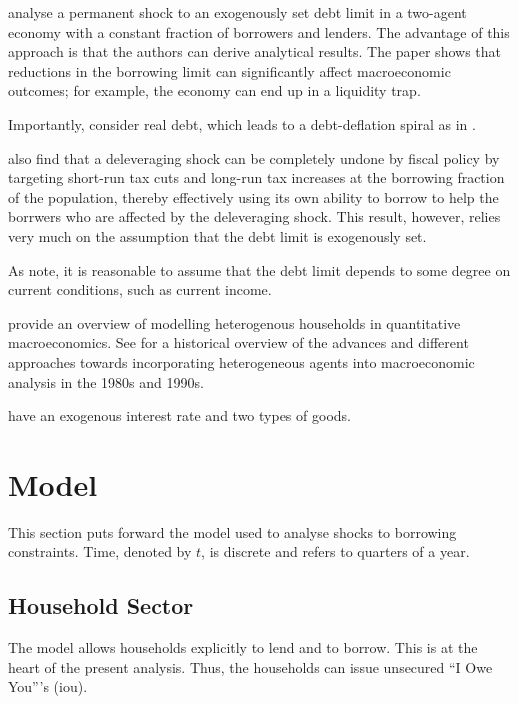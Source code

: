 \documentclass[12pt]{article} %
\numberwithin{equation}{section} %
\begin{document}
\textcite{egg2012} analyse a permanent shock to an exogenously set debt limit in a two-agent economy with a constant fraction of borrowers and lenders. The advantage of this approach is that the authors can derive analytical results. The paper shows that reductions in the borrowing limit can significantly affect macroeconomic outcomes; for example, the economy can end up in a liquidity trap.

Importantly, \textcite{egg2012} consider real debt, which leads to a debt-deflation spiral as in \textcite{fisher1933}.

\textcite{egg2012} also find that a deleveraging shock can be completely undone by fiscal policy by targeting short-run tax cuts and long-run tax increases at the borrowing fraction of the population, thereby effectively using its own ability to borrow to help the borrwers who are affected by the deleveraging shock. This result, however, relies very much on the assumption that the debt limit is exogenously set.

As \textcite{egg2012} note, it is reasonable to assume that the debt limit depends to some degree on current conditions, such as current income.

\textcite{heath2009} provide an overview of modelling heterogenous households in quantitative macroeconomics. See \textcite{cherrier2023} for a historical overview of the advances and different approaches towards incorporating heterogeneous agents into macroeconomic analysis in the 1980s and 1990s.

\textcite{riosrull2015} have an exogenous interest rate and two types of goods.

\section{Model}
\label{sec:model}

This section puts forward the model used to analyse shocks to borrowing constraints. Time, denoted by $t$, is discrete and refers to quarters of a year.

\subsection{Household Sector}
\label{sec:model-hh}

The model allows households explicitly to lend and to borrow. This is at the heart of the present analysis. Thus, the households can issue unsecured \enquote{I Owe You}'s (\Gls{iou}).
\end{document}
